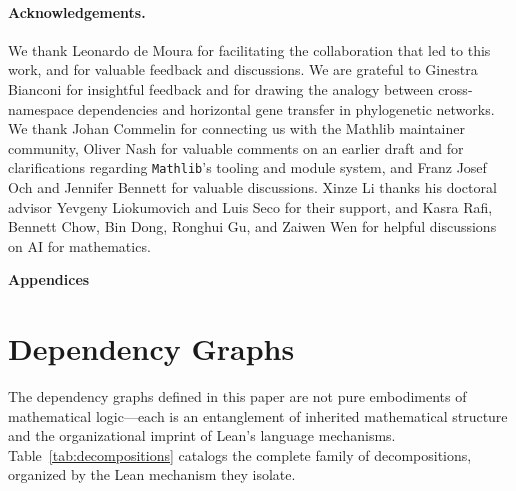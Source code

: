 \documentclass[10pt]{article}
\begin{document}
\paragraph{Acknowledgements.}
We thank Leonardo de Moura for facilitating the collaboration that led to this work, and for valuable feedback and discussions. We are grateful to Ginestra Bianconi for insightful feedback and for drawing the analogy between cross-namespace dependencies and horizontal gene transfer in phylogenetic networks. We thank Johan Commelin for connecting us with the Mathlib maintainer community, Oliver Nash for valuable comments on an earlier draft and for clarifications regarding \texttt{Mathlib}'s tooling and module system, and Franz Josef Och and Jennifer Bennett for valuable discussions. Xinze Li thanks his doctoral advisor Yevgeny Liokumovich and Luis Seco for their support, and Kasra Rafi, Bennett Chow, Bin Dong, Ronghui Gu, and Zaiwen Wen for helpful discussions on AI for mathematics.

\begingroup
{}
\let\oldbibliography\thebibliography
\renewcommand{\thebibliography}[1]{%
  \oldbibliography{#1}%
  \setlength{\itemsep}{0pt}%
  \setlength{\parsep}{0pt}%
  \setlength{\parskip}{0pt}%
}


\endgroup

\newpage
{}
\appendix
\begin{center}
\vspace*{2cm}
{\Huge\bfseries Appendices}
\vspace{1cm}

\end{center}
\vfill
\setcounter{tocdepth}{2}
\tableofcontents
\newpage

\section{Dependency Graphs}
\label{sec:graph-definitions}

The dependency graphs defined in this paper are not pure embodiments of mathematical logic---each is an entanglement of inherited mathematical structure and the organizational imprint of Lean's language mechanisms. Table~\ref{tab:decompositions} catalogs the complete family of decompositions, organized by the Lean mechanism they isolate.
\end{document}
